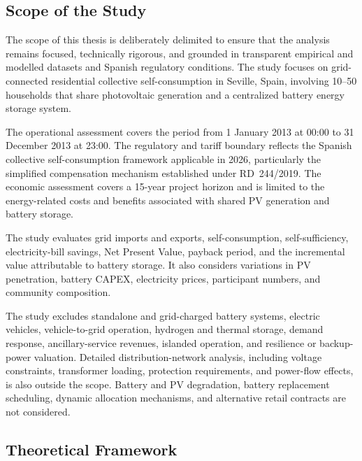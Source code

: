 \subsection{Scope of the Study}\label{scope-of-the-study}

The scope of this thesis is deliberately delimited to ensure that the
analysis remains focused, technically rigorous, and grounded in
transparent empirical and modelled datasets and Spanish regulatory
conditions. The study focuses on grid-connected residential collective
self-consumption in Seville, Spain, involving 10--50 households that
share photovoltaic generation and a centralized battery energy storage
system.

The operational assessment covers the period from 1 January 2013 at
00:00 to 31 December 2013 at 23:00. The regulatory and tariff boundary
reflects the Spanish collective self-consumption framework applicable in
2026, particularly the simplified compensation mechanism established
under RD~244/2019. The economic assessment covers a 15-year project
horizon and is limited to the energy-related costs and benefits
associated with shared PV generation and battery storage.

The study evaluates grid imports and exports, self-consumption,
self-sufficiency, electricity-bill savings, Net Present Value, payback
period, and the incremental value attributable to battery storage. It
also considers variations in PV penetration, battery CAPEX, electricity
prices, participant numbers, and community composition.

The study excludes standalone and grid-charged battery systems, electric
vehicles, vehicle-to-grid operation, hydrogen and thermal storage,
demand response, ancillary-service revenues, islanded operation, and
resilience or backup-power valuation. Detailed distribution-network
analysis, including voltage constraints, transformer loading, protection
requirements, and power-flow effects, is also outside the scope.
Battery and PV degradation, battery replacement scheduling, dynamic
allocation mechanisms, and alternative retail contracts are not
considered.


\subsection{Theoretical Framework}
\label{subsec:theoretical-framework}

